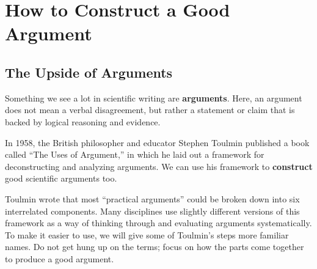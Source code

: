 \documentclass[
]{book}
\begin{document}
\hypertarget{toulmin615}{%
\chapter{How to Construct a Good Argument}\label{toulmin615}}

\hypertarget{the-upside-of-arguments}{%
\section{The Upside of Arguments}\label{the-upside-of-arguments}}

Something we see a lot in scientific writing are \textbf{arguments}. Here, an argument does not mean a verbal disagreement, but rather a statement or claim that is backed by logical reasoning and evidence.

In 1958, the British philosopher and educator Stephen Toulmin published a book called ``The Uses of Argument,'' in which he laid out a framework for deconstructing and analyzing arguments. We can use his framework to \textbf{construct} good scientific arguments too.

Toulmin wrote that most ``practical arguments'' could be broken down into six interrelated components. Many disciplines use slightly different versions of this framework as a way of thinking through and evaluating arguments systematically. To make it easier to use, we will give some of Toulmin's steps more familiar names. Do not get hung up on the terms; focus on how the parts come together to produce a good argument.
\end{document}
